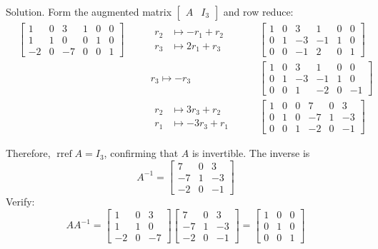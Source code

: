 \begin{solution}
    Solution. Form the augmented matrix $\left[\begin{array}{ll}A & I_3\end{array}\right]$ and row reduce:
\[
\begin{alignedat}{3}
& \left[\begin{array}{cccccc}
1 & 0 & 3 & 1 & 0 & 0 \\
1 & 1 & 0 & 0 & 1 & 0 \\
-2 & 0 & -7 & 0 & 0 & 1
\end{array}\right]
& \quad & \begin{aligned}
    r_2 &\mapsto -r_1 + r_2 \\
    r_3 &\mapsto 2 r_1 + r_3
\end{aligned}
& \quad & \left[\begin{array}{cccccc}
1 & 0 & 3 & 1 & 0 & 0 \\
0 & 1 & -3 & -1 & 1 & 0 \\
0 & 0 & -1 & 2 & 0 & 1
\end{array}\right] \\[10pt]
& & \quad & r_3 \mapsto -r_3
& \quad & \left[\begin{array}{cccccc}
1 & 0 & 3 & 1 & 0 & 0 \\
0 & 1 & -3 & -1 & 1 & 0 \\
0 & 0 & 1 & -2 & 0 & -1
\end{array}\right] \\[10pt]
& & \quad & \begin{aligned}
    r_2 &\mapsto 3 r_3 + r_2 \\
    r_1 &\mapsto -3 r_3 + r_1
\end{aligned}
& \quad & \left[\begin{array}{cccccc}
1 & 0 & 0 & 7 & 0 & 3 \\
0 & 1 & 0 & -7 & 1 & -3 \\
0 & 0 & 1 & -2 & 0 & -1
\end{array}\right]
\end{alignedat}
\]

Therefore, \(\operatorname{rref}A = I_3\), confirming that \( A \) is invertible. The inverse is
\[
A^{-1} = \left[\begin{array}{ccc}
7 & 0 & 3 \\
-7 & 1 & -3 \\
-2 & 0 & -1
\end{array}\right]
\]
Verify:
\[
AA^{-1}=\left[\begin{array}{ccc}
1 & 0 & 3 \\
1 & 1 & 0 \\
-2 & 0 & -7
\end{array}\right]\left[\begin{array}{ccc}
7 & 0 & 3 \\
-7 & 1 & -3 \\
-2 & 0 & -1
\end{array}\right]=\left[\begin{array}{lll}
1 & 0 & 0 \\
0 & 1 & 0 \\
0 & 0 & 1
\end{array}\right]
\]

\end{solution}

